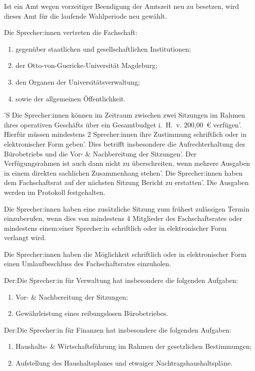 \documentclass[%
    parskip=half,
]{scrartcl}
\begin{document}
\begin{contract}
Ist ein Amt wegen vorzeitiger Beendigung der Amtszeit neu zu besetzen, wird dieses Amt für die laufende Wahlperiode neu gewählt.


Die Sprecher:innen vertreten die Fachschaft:
\begin{enumerate}[\qquad a)]
    \item gegenüber staatlichen und gesellschaftlichen Institutionen;
    \item der Otto-von-Guericke-Universität Magdeburg;
    \item den Organen der Universitätsverwaltung;
    \item sowie der allgemeinen Öffentlichkeit.
\end{enumerate}

'S Die Sprecher:innen können im Zeitraum zwischen zwei Sitzungen im Rahmen ihres operativen Geschäfts über ein Gesamtbudget i.~H.~v. 200,00~€ verfügen'.
Hierfür müssen mindestens 2 Sprecher:innen ihre Zustimmung schriftlich oder in elektronischer Form geben'.
Dies betrifft insbesondere die Aufrechterhaltung des Bürobetriebs und die Vor- \& Nachbereitung der Sitzungen'.
Der Verfügungsrahmen ist auch dann nicht zu überschreiten, wenn mehrere Ausgaben in einem direkten sachlichen Zusammenhang stehen'. 
Die Sprecher:innen haben dem Fachschaftsrat auf der nächsten Sitzung Bericht zu erstatten'.
Die Ausgaben werden im Protokoll festgehalten.

Die Sprecher:innen haben eine zusätzliche Sitzung zum frühest zulässigen Termin einzuberufen, wenn dies von mindestens 4 Mitglieder des Fachschaftsrates oder mindestens einem:einer Sprecher:in schriftlich oder in elektronischer Form verlangt wird.

Die Sprecher:innen haben die Möglichkeit schriftlich oder in elektronischer Form einen Umlaufbeschluss des Fachschaftsrates einzuholen.

Der:Die Sprecher:in für Verwaltung hat insbesondere die folgenden Aufgaben:
\begin{enumerate}[\qquad a)]
    \item Vor- \& Nachbereitung der Sitzungen;
    \item Gewährleistung eines reibungslosen Bürobetriebes.
\end{enumerate}

Der:Die Sprecher:in für Finanzen hat insbesondere die folgenden Aufgaben:
\begin{enumerate}[\qquad a)]
    \item Haushalts- \& Wirtschaftsführung im Rahmen der gesetzlichen Bestimmungen;
    \item Aufstellung des Haushaltsplanes und etwaiger Nachtragshaushaltspläne.
\end{enumerate}

\end{contract}
\end{document}
